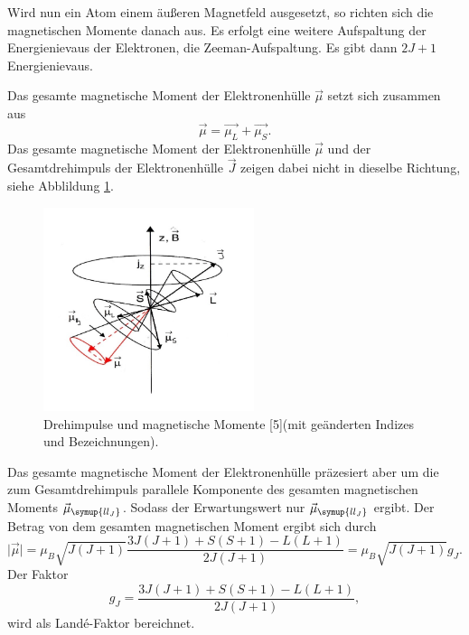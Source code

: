 Wird nun ein Atom einem äußeren Magnetfeld ausgesetzt, so richten sich die magnetischen Momente 
danach aus. Es erfolgt eine weitere Aufspaltung der Energienievaus der Elektronen, die Zeeman-Aufspaltung. 
Es gibt dann $2J+1$ Energienievaus.

Das gesamte magnetische Moment der 
Elektronenhülle $\vec{\mu}$ setzt sich zusammen aus 
\begin{equation*}
     \vec{\mu} =  \vec{\mu_L} + \vec{\mu_S}.
\end{equation*}
Das gesamte magnetische Moment der Elektronenhülle $\vec{\mu}$ und der Gesamtdrehimpuls der 
Elektronenhülle $\vec{J}$ zeigen dabei nicht in dieselbe Richtung, siehe Abblildung \ref{fig:mm}.

\begin{figure}
  \centering
  \includegraphics[width=0.55\textwidth]{mag.mo.jpeg}
  \caption{Drehimpulse und magnetische Momente [5](mit geänderten Indizes und Bezeichnungen).}
  \label{fig:mm}
\end{figure}
\FloatBarrier

Das gesamte magnetische Moment der Elektronenhülle präzesiert aber um die zum Gesamtdrehimpuls parallele 
Komponente des gesamten magnetischen Moments $\vec{\mu}_{\symup{ll_J}}$. Sodass der Erwartungswert nur 
$\vec{\mu}_{\symup{ll_J}}$ ergibt. Der Betrag von dem gesamten magnetischen Moment ergibt sich durch 
\begin{equation*}
    \lvert \vec{\mu} \rvert = \mu_B \sqrt{J (J+1)} \frac{3J(J+1)+ S(S + 1) - L (L+1)}{2 J(J +1)} = \mu_B \sqrt{J (J+1)} g_J.
\end{equation*}
Der Faktor 
\begin{equation}
    g_J = \frac{3J(J+1)+ S(S + 1) - L (L+1)}{2 J(J +1)},
    \label{eqn:gJ}
\end{equation}
wird als Landé-Faktor bereichnet. 

